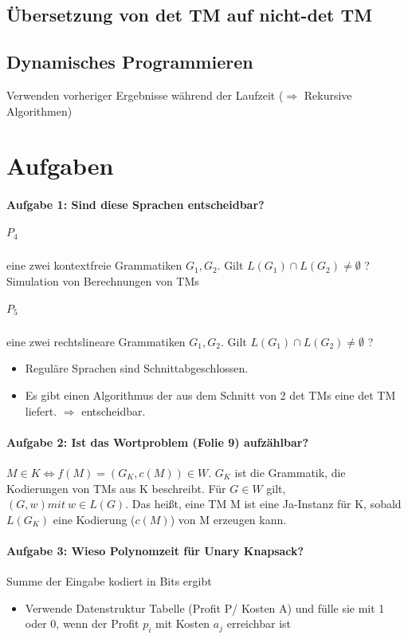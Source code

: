 \documentclass[ngerman]{scrartcl}
\begin{document}
\subsection{Übersetzung von det TM auf nicht-det TM}

\subsection{Dynamisches Programmieren}
Verwenden vorheriger Ergebnisse während der Laufzeit ($ \Rightarrow $ Rekursive Algorithmen)




%
%
%
%
\section{Aufgaben}

\paragraph{Aufgabe 1: Sind diese Sprachen entscheidbar?} 

\subparagraph{$ P_4 $} eine zwei kontextfreie Grammatiken $ G_1, G_2 $. Gilt $ L(G_1) \cap L(G_2) \neq \emptyset $ ? 
Simulation von Berechnungen von TMs

\subparagraph{$ P_5 $} eine zwei rechtslineare Grammatiken $ G_1, G_2 $. Gilt $ L(G_1) \cap L(G_2) \neq \emptyset $ ?  
\begin{itemize}
    \item Reguläre Sprachen sind Schnittabgeschlossen. 
    \item Es gibt einen Algorithmus der aus dem Schnitt von 2 det TMs eine det TM liefert. $ \Rightarrow $ entscheidbar.
\end{itemize}

\paragraph{Aufgabe 2: Ist das Wortproblem (Folie 9) aufzählbar?} $ M \in K \Leftrightarrow f(M) = (G_K, c(M)) \in W $. $G_K$ ist die Grammatik, die Kodierungen von TMs aus K beschreibt. Für $G \in W$ gilt, $(G, w) mit\ w \in L(G)$. Das heißt, eine TM M ist eine Ja-Instanz für K, sobald $L(G_K)$ eine Kodierung ($c(M)$) von M erzeugen kann.
\paragraph{Aufgabe 3: Wieso Polynomzeit für Unary Knapsack?} Summe der Eingabe kodiert in Bits ergibt 
\begin{itemize}
    \item Verwende Datenstruktur Tabelle (Profit P/ Kosten A) und fülle sie mit 1 oder 0, wenn der Profit $ p_i $ mit Kosten $ a_j $ erreichbar ist 
\end{itemize}
\end{document}
